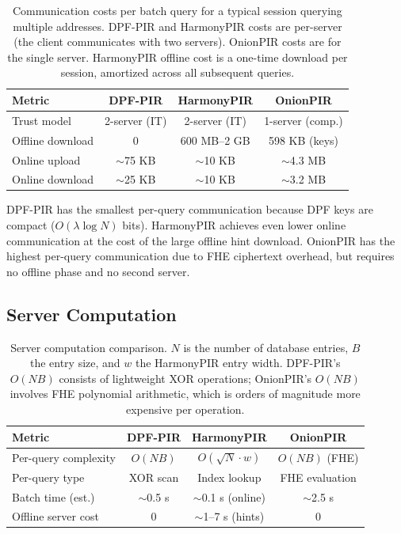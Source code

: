 \begin{table}[htbp]
\centering
\begin{tabular}{|l|c|c|c|}
\hline
\textbf{Metric} & \textbf{DPF-PIR} & \textbf{HarmonyPIR} & \textbf{OnionPIR} \\
\hline
Trust model & 2-server (IT) & 2-server (IT) & 1-server (comp.) \\
Offline download & 0 & 600 MB--2 GB & 598 KB (keys) \\
Online upload & $\sim$75 KB & $\sim$10 KB & $\sim$4.3 MB \\
Online download & $\sim$25 KB & $\sim$10 KB & $\sim$3.2 MB \\
\hline
\end{tabular}
\caption{Communication costs per batch query for a typical session querying multiple addresses. DPF-PIR and HarmonyPIR costs are per-server (the client communicates with two servers). OnionPIR costs are for the single server. HarmonyPIR offline cost is a one-time download per session, amortized across all subsequent queries.}
\label{tab:comparison-comm}
\end{table}

DPF-PIR has the smallest per-query communication because DPF keys are compact ($O(\lambda \log N)$ bits). HarmonyPIR achieves even lower online communication at the cost of the large offline hint download. OnionPIR has the highest per-query communication due to FHE ciphertext overhead, but requires no offline phase and no second server.

\subsection{Server Computation}

\begin{table}[htbp]
\centering
\begin{tabular}{|l|c|c|c|}
\hline
\textbf{Metric} & \textbf{DPF-PIR} & \textbf{HarmonyPIR} & \textbf{OnionPIR} \\
\hline
Per-query complexity & $O(NB)$ & $O(\sqrt{N} \cdot w)$ & $O(NB)$ (FHE) \\
Per-query type & XOR scan & Index lookup & FHE evaluation \\
Batch time (est.) & $\sim$0.5 s & $\sim$0.1 s (online) & $\sim$2.5 s \\
Offline server cost & 0 & $\sim$1--7 s (hints) & 0 \\
\hline
\end{tabular}
\caption{Server computation comparison. $N$ is the number of database entries, $B$ the entry size, and $w$ the HarmonyPIR entry width. DPF-PIR's $O(NB)$ consists of lightweight XOR operations; OnionPIR's $O(NB)$ involves FHE polynomial arithmetic, which is orders of magnitude more expensive per operation.}
\label{tab:comparison-compute}
\end{table}


